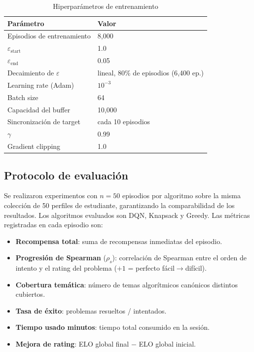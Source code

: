 \documentclass[12pt, a4paper]{article}
\begin{document}
\begin{table}[H]
\centering
\caption{Hiperparámetros de entrenamiento}
\begin{tabular}{ll}
\toprule
\textbf{Parámetro} & \textbf{Valor} \\
\midrule
Episodios de entrenamiento    & 8{,}000 \\
$\varepsilon_{\text{start}}$  & 1.0 \\
$\varepsilon_{\text{end}}$    & 0.05 \\
Decaimiento de $\varepsilon$  & lineal, 80\% de episodios (6{,}400 ep.) \\
Learning rate (Adam)          & $10^{-3}$ \\
Batch size                    & 64 \\
Capacidad del buffer          & 10{,}000 \\
Sincronización de target      & cada 10 episodios \\
$\gamma$                      & 0.99 \\
Gradient clipping             & 1.0 \\
\bottomrule
\end{tabular}
\end{table}

\subsection{Protocolo de evaluación}

Se realizaron experimentos con $n = 50$ episodios por algoritmo sobre la misma
colección de 50 perfiles de estudiante, garantizando la comparabilidad de los
resultados. Los algoritmos evaluados son DQN, Knapsack y Greedy. Las métricas
registradas en cada episodio son:

\begin{itemize}
  \item \textbf{Recompensa total}: suma de recompensas inmediatas del episodio.
  \item \textbf{Progresión de Spearman} ($\rho_s$): correlación de Spearman
    entre el orden de intento y el rating del problema ($+1$ = perfecto
    fácil$\to$difícil).
  \item \textbf{Cobertura temática}: número de temas algorítmicos canónicos
    distintos cubiertos.
  \item \textbf{Tasa de éxito}: problemas resueltos / intentados.
  \item \textbf{Tiempo usado minutos}: tiempo total consumido en la sesión.
  \item \textbf{Mejora de rating}: ELO global final $-$ ELO global inicial.
\end{itemize}
\end{document}
